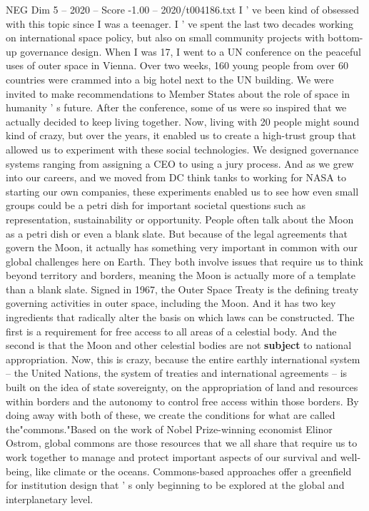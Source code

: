 \begin{textsample}{NEG Dim 5 – 2020 – Score -1.00 – 2020/t004186.txt}
I ' ve been kind of obsessed with this topic since I was a teenager.
I ' ve spent the last two decades working on international space policy, but also on small community projects with bottom-up governance design.
When I was 17, I went to a UN conference on the peaceful uses of outer space in Vienna.
Over two weeks, 160 young people from over 60 countries were crammed into a big hotel next to the UN building.
We were invited to make recommendations to Member States about the role of space in humanity ' s future.
After the conference, some of us were so inspired that we actually decided to keep living together.
Now, living with 20 people might sound kind of crazy, but over the years, it enabled us to create a high-trust group that allowed us to experiment with these social technologies.
We designed governance systems ranging from assigning a CEO to using a jury process.
And as we grew into our careers, and we moved from DC think tanks to working for NASA to starting our own companies, these experiments enabled us to see how even small groups could be a petri dish for important societal questions such as representation, sustainability or opportunity.
People often talk about the Moon as a petri dish or even a blank slate.
But because of the legal agreements that govern the Moon, it actually has something very important in common with our global challenges here on Earth.
They both involve issues that require us to think beyond territory and borders, meaning the Moon is actually more of a template than a blank slate.
Signed in 1967, the Outer Space Treaty is the defining treaty governing activities in outer space, including the Moon.
And it has two key ingredients that radically alter the basis on which laws can be constructed.
The first is a requirement for free access to all areas of a celestial body.
And the second is that the Moon and other celestial bodies are not \textbf{subject} to national appropriation.
Now, this is crazy, because the entire earthly international system -- the United Nations, the system of treaties and international agreements -- is built on the idea of state sovereignty, on the appropriation of land and resources within borders and the autonomy to control free access within those borders.
By doing away with both of these, we create the conditions for what are called the"commons."Based on the work of Nobel Prize-winning economist Elinor Ostrom, global commons are those resources that we all share that require us to work together to manage and protect important aspects of our survival and well-being, like climate or the oceans.
Commons-based approaches offer a greenfield for institution design that ' s only beginning to be explored at the global and interplanetary level.

\end{textsample}
